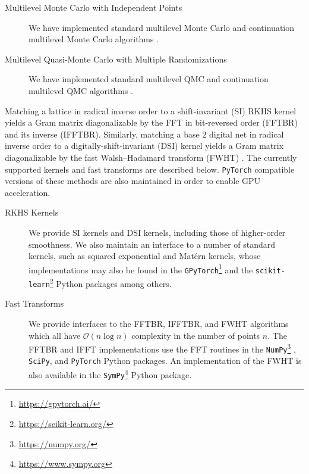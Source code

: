 \documentclass[acmsmall]{acmart}
\begin{document}
\begin{description}
\begin{description}
        \item[Multilevel Monte Carlo with Independent Points] We have implemented standard multilevel Monte Carlo \citep{giles.MLMC_path_simulation} and continuation multilevel Monte Carlo algorithms \citep{robbe2016dimension,robbe2019recycling}.  
        \item[Multilevel Quasi-Monte Carlo with Multiple Randomizations] We have implemented standard multilevel QMC \citep{giles.mlqmc_path_simulation} and continuation multilevel QMC algorithms \citep{robbe.multi_index_qmc}. 
    \end{description}
    \item[Fast Kernel Computations] Matching a lattice in radical inverse order to a shift-invariant (SI) RKHS kernel yields a Gram matrix diagonalizable by the FFT in bit-reversed order (FFTBR) and its inverse (IFFTBR). Similarly, matching a base $2$ digital net in radical inverse order to a digitally-shift-invariant (DSI) kernel yields a Gram matrix diagonalizable by the fast Walsh--Hadamard transform (FWHT) \citep{fino.fwht}. The  currently supported kernels and fast transforms are described below. \texttt{PyTorch} compatible versions of these methods are also maintained in order to enable GPU acceleration. 
    \begin{description}
        \item[RKHS Kernels] We provide SI kernels and DSI kernels, including those of higher-order smoothness. We also maintain an interface to a number of standard kernels, such as squared exponential and Mat\'ern kernels, whose implementations may also be found in the \texttt{GPyTorch}\footnote{\label{url:gpytorch}\url{https://gpytorch.ai/}} \citep{gardner.gpytorch_GPU_conjugate_gradient} and the \texttt{scikit-learn}\footnote{\label{url:scikitlearn}\url{https://scikit-learn.org/}} \citep{scikit-learn} Python packages among others. 
        \item[Fast Transforms] We provide interfaces to the FFTBR, IFFTBR, and FWHT algorithms which all have $\mathcal{O}(n \log n)$ complexity in the number of points $n$. The FFTBR and IFFT implementations use the FFT routines in the \texttt{NumPy}\footnote{\label{url:numpy}\url{https://numpy.org/}} \citep{NumPy.software}, \texttt{SciPy}, and \texttt{PyTorch} Python packages. An implementation of the FWHT is also available in the \texttt{SymPy}\footnote{\label{url:sympy}\url{https://www.sympy.org}} \citep{10.7717/peerj-cs.103} Python package.
    \end{description}
\end{description}
\end{document}
